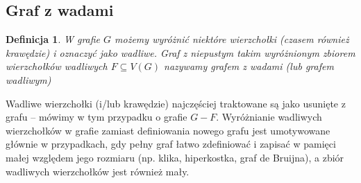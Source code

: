 \documentclass{pracamgr}
\newtheorem{defi}{Definicja}[section] %
\begin{document}
   \subsection{Graf z wadami}
    \begin{defi}\label{graf z wadami}
     W grafie $G$ możemy wyróżnić niektóre wierzchołki (czasem również krawędzie) i oznaczyć jako wadliwe.
     Graf z niepustym takim wyróżnionym zbiorem wierzchołków wadliwych $F\subseteq V(G)$ nazywamy \emph{grafem z wadami} (lub \emph{grafem wadliwym})
    \end{defi}%
    Wadliwe wierzchołki (i/lub krawędzie) najczęściej traktowane są jako usunięte z grafu -- mówimy w tym przypadku o grafie $G-F$.
    Wyróżnianie wadliwych wierzchołków w grafie zamiast definiowania nowego grafu jest umotywowane głównie w przypadkach,
    gdy pełny graf łatwo zdefiniować i zapisać w pamięci małej względem jego rozmiaru (np. klika, hiperkostka, graf de Bruijna),
    a zbiór wadliwych wierzchołków jest również mały.
\end{document}
